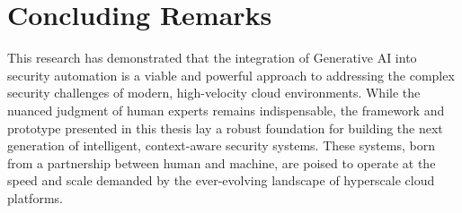 \section{Concluding Remarks}

This research has demonstrated that the integration of Generative AI into security automation is a viable and powerful approach to addressing the complex security challenges of modern, high-velocity cloud environments. While the nuanced judgment of human experts remains indispensable, the framework and prototype presented in this thesis lay a robust foundation for building the next generation of intelligent, context-aware security systems. These systems, born from a partnership between human and machine, are poised to operate at the speed and scale demanded by the ever-evolving landscape of hyperscale cloud platforms.